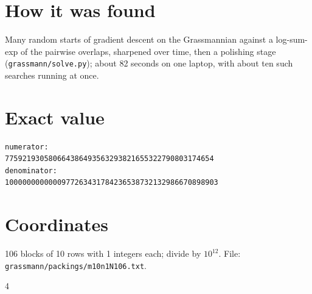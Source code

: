 \documentclass[11pt,a4paper]{article}
\begin{document}
\section{How it was found}
Many random starts of gradient descent on the Grassmannian against a log-sum-exp of the pairwise overlaps, sharpened over time, then a polishing stage (\texttt{grassmann/solve.py}); about 82 seconds on one laptop, with about ten such searches running at once.


\appendix
\section{Exact value}
{\small
\begin{verbatim}
numerator:
775921930580664386493563293821655322790803174654
denominator:
1000000000000977263431784236538732132986670898903
\end{verbatim}}

\section{Coordinates}
106 blocks of 10 rows with 1 integers each; divide by $10^{12}$. File: \texttt{grassmann/packings/m10n1N106.txt}.
{\tiny
\begin{multicols}{4}
\end{multicols}}
\end{document}
